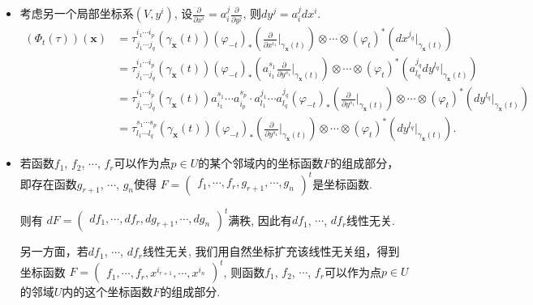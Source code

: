 \begin {itemize}
	
	\item[35.] 
    考虑另一个局部坐标系$(V,y^i)$, 设$\frac{\partial}{\partial x^i}=a^j_i\frac{\partial}{\partial y^j}$, 则$dy^j=a^j_idx^i$.
	\begin{align*}
	(\Phi_t(\tau))(\mathbf{x})
	&=\tau^{i_1\cdots i_p}_{j_1\cdots j_q}(\gamma_\mathbf{x}(t))(\varphi_{-t})_*(\frac{\partial}{\partial x^{i_1}}|_{\gamma_\mathbf{x}(t)})\otimes \cdots  \otimes (\varphi_t)^*(dx^{j_q}|_{\gamma_\mathbf{x}(t)})\\
	&=\tau^{i_1\cdots i_p}_{j_1\cdots j_q}(\gamma_\mathbf{x}(t))(\varphi_{-t})_*(a^{s_1}_{i_1}\frac{\partial}{\partial y^{s_1}}|_{\gamma_\mathbf{x}(t)})\otimes \cdots  \otimes (\varphi_t)^*(a^{j_q}_{l_q}dy^{l_q}|_{\gamma_\mathbf{x}(t)})\\
	&=\tau^{i_1\cdots i_p}_{j_1\cdots j_q}(\gamma_\mathbf{x}(t))a^{s_1}_{i_1}\cdots a^{s_p}_{i_p}\cdot a^{j_1}_{l_1}\cdots a^{j_q}_{l_q}(\varphi_{-t})_*(\frac{\partial}{\partial y^{s_1}}|_{\gamma_\mathbf{x}(t)})\otimes \cdots  \otimes (\varphi_t)^*(dy^{l_q}|_{\gamma_\mathbf{x}(t)})\\
	&=\tau^{s_1\cdots s_p}_{l_1\cdots l_q}(\gamma_\mathbf{x}(t))(\varphi_{-t})_*(\frac{\partial}{\partial y^{s_1}}|_{\gamma_\mathbf{x}(t)})\otimes \cdots  \otimes (\varphi_t)^*(dy^{l_q}|_{\gamma_\mathbf{x}(t)}).
	\end{align*}
	
	\item[36.] 
    若函数$f_1$, $f_2$, $\cdots$, $f_r$可以作为点$p\in U$的某个邻域内的坐标函数$F$的组成部分，
	即存在函数$g_{r+1}$, $\cdots$, $g_n$使得
	$F=\begin{pmatrix}
		f_1,
		\cdots,
		f_r,
		g_{r+1},
		\cdots,
		g_n
		\end{pmatrix}^t$是坐标函数.\par 则有
		$dF=\begin{pmatrix}
		df_1,
		\cdots,
		df_r,
		dg_{r+1},
		\cdots,
		dg_n
		\end{pmatrix}^t$满秩, 因此有$df_1$, $\cdots$, $df_r$线性无关.\par
		
		另一方面，若$df_1$, $\cdots$, $df_r$线性无关, 我们用自然坐标扩充该线性无关组，得到坐标函数
		$F=\begin{pmatrix}
		f_1,
		\cdots,
		f_r,
		x^{i_{r+1}},
		\cdots,
		x^{i_n}
		\end{pmatrix}^t$, 则函数$f_1$, $f_2$, $\cdots$, $f_r$可以作为点$p\in U$的邻域$U$内的这个坐标函数$F$的组成部分.
	
	
	

\end{itemize}
